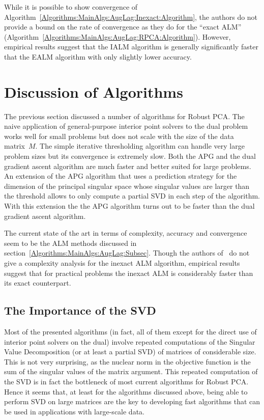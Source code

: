 \documentclass{../../common/projectreport}
\begin{document}
While it is possible to show convergence of Algorithm~\ref{Algorithms:MainAlgs:AugLag:Inexact:Algorithm}, the authors do not provide a bound on the rate of convergence as they do for the ``exact ALM'' (Algorithm~\ref{Algorithms:MainAlgs:AugLag:RPCA:Algorithm}). However, empirical results suggest that the IALM algorithm is generally significantly faster that the EALM algorithm with only slightly lower accuracy. 



\section{Discussion of Algorithms}
\label{Algorithms:Discussion:Sec}

The previous section discussed a number of algorithms for Robust PCA. The naive application of general-purpose interior point solvers to the dual problem works well for small problems but does not scale with the size of the data matrix~$M$. The simple iterative thresholding algorithm can handle very large problem sizes but its convergence is extremely slow. Both the APG and the dual gradient ascent algorithm are much faster and better suited for large problems. An extension of the APG algorithm that uses a prediction strategy for the dimension of the principal singular space whose singular values are larger than the threshold allows to only compute a partial SVD in each step of the algorithm. With this extension the the APG algorithm turns out to be faster than the dual gradient ascent algorithm. 

The current state of the art in terms of complexity, accuracy and convergence seem to be the ALM methods discussed in section~\ref{Algorithms:MainAlgs:AugLag:Subsec}. Though the authors of~\cite{Lin:2010fk} do not give a complexity analysis for the inexact ALM algorithm, empirical results suggest that for practical problems the inexact ALM is considerably faster than its exact counterpart. 



\subsection{The Importance of the SVD}
\label{Algorithms:Discussion:SVD:Subsec}


Most of the presented algorithms (in fact, all of them except for the direct use of interior point solvers on the dual) involve repeated computations of the Singular Value Decomposition (or at least a partial SVD) of matrices of considerable size. This is not very surprising, as the nuclear norm in the objective function is the sum of the singular values of the matrix argument. This repeated computation of the SVD is in fact the bottleneck of most current algorithms for Robust PCA. Hence it seems that, at least for the algorithms discussed above, being able to perform SVD on large matrices are the key to developing fast algorithms that can be used in applications with large-scale data.
\end{document}
